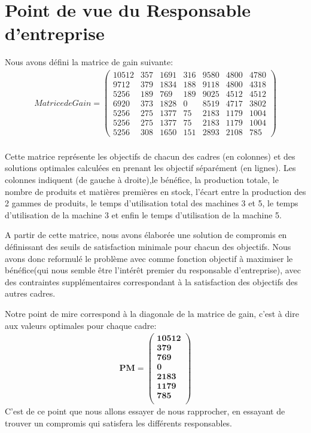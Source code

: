 \documentclass[12pt]{article}
\begin{document}
\section{Point de vue du Responsable d'entreprise}
Nous avons défini la matrice de gain suivante:
\begin{align*}
Matrice de Gain =
 \begin{pmatrix}
    10512    &357   &1691    &316   &9580   &4800   &4780\\
    9712     &379   &1834    &188   &9118   &4800   &4318\\
    5256    &189    &769    &189     &9025   &4512   &4512\\
    6920    &373   &1828    &0       &8519    &4717   &3802\\
    5256    &275   &1377    &75     &2183    &1179   &1004\\
    5256    &275   &1377   &75     &2183    &1179   &1004\\
    5256    &308   &1650    &151   &2893    &2108    &785
 \end{pmatrix}
\end{align*}\\

Cette matrice représente les objectifs de chacun des cadres (en colonnes) et des solutions optimales calculées en prenant les objectif séparément (en lignes). Les colonnes indiquent (de gauche à droite),le bénéfice, la production totale, le nombre de produits et matières premières en stock, l'écart entre la production des 2 gammes de produits, le temps d'utilisation total des machines 3 et 5, le temps d'utilisation de la machine 3 et enfin le temps d'utilisation de la machine 5.

A partir de cette matrice, nous avons élaborée une solution de compromis en définissant des seuils de satisfaction minimale pour chacun des objectifs. Nous avons donc reformulé le problème avec comme fonction objectif à maximiser le bénéfice(qui nous semble être l'intérêt premier du responsable d'entreprise), avec des contraintes supplémentaires correspondant à la satisfaction des objectifs des autres cadres. 

Notre point de mire correspond à la diagonale de la matrice de gain, c'est à dire aux valeurs optimales pour chaque cadre:
\begin{align*}
\boldsymbol{PM = 
   \left (
   \begin{aligned}
      10512\\
      379\\
      769\\
      0\\
      2183\\
      1179\\
      785\\
   \end{aligned}
   \right )
 } 
\end{align*}
C'est de ce point que nous allons essayer de nous rapprocher, en essayant de trouver un compromis qui satisfera les différents responsables.
\end{document}
